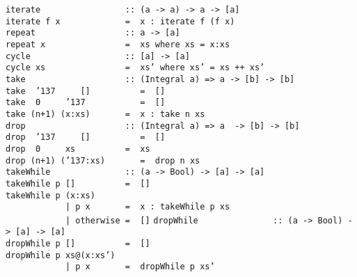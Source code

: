 %
\eprogB\noindent\bprogB
\mbox{\tt iterate\ \ \ \ \ \ \ \ \ \ \ \ \ \ \ \ \ ::\ (a\ ->\ a)\ ->\ a\ ->\ [a]}\\
\mbox{\tt iterate\ f\ x\ \ \ \ \ \ \ \ \ \ \ \ \ =\ \ x\ :\ iterate\ f\ (f\ x)}
%
\eprogB\noindent\bprogB
\mbox{\tt repeat\ \ \ \ \ \ \ \ \ \ \ \ \ \ \ \ \ \ ::\ a\ ->\ [a]}\\
\mbox{\tt repeat\ x\ \ \ \ \ \ \ \ \ \ \ \ \ \ \ \ =\ \ xs\ where\ xs\ =\ x:xs}
%
\eprogB\noindent\bprogB
\mbox{\tt cycle\ \ \ \ \ \ \ \ \ \ \ \ \ \ \ \ \ \ \ ::\ [a]\ ->\ [a]}\\
\mbox{\tt cycle\ xs\ \ \ \ \ \ \ \ \ \ \ \ \ \ \ \ =\ \ xs'\ where\ xs'\ =\ xs\ ++\ xs'}
%
\eprogB\noindent\bprogB
\mbox{\tt take\ \ \ \ \ \ \ \ \ \ \ \ \ \ \ \ \ \ \ \ ::\ (Integral\ a)\ =>\ a\ ->\ [b]\ ->\ [b]}\\
\mbox{\tt take\ \ {\char'137}\ \ \ \ \ []\ \ \ \ \ \ \ \ \ \ =\ \ []}\\
\mbox{\tt take\ \ 0\ \ \ \ \ {\char'137}\ \ \ \ \ \ \ \ \ \ \ =\ \ []}\\
\mbox{\tt take\ (n+1)\ (x:xs)\ \ \ \ \ \ \ =\ \ x\ :\ take\ n\ xs}
%
\eprogB\noindent\bprogB
\mbox{\tt drop\ \ \ \ \ \ \ \ \ \ \ \ \ \ \ \ \ \ \ \ ::\ (Integral\ a)\ =>\ a\ \ ->\ [b]\ ->\ [b]}\\
\mbox{\tt drop\ \ {\char'137}\ \ \ \ \ []\ \ \ \ \ \ \ \ \ \ =\ \ []}\\
\mbox{\tt drop\ \ 0\ \ \ \ \ xs\ \ \ \ \ \ \ \ \ \ =\ \ xs}\\
\mbox{\tt drop\ (n+1)\ ({\char'137}:xs)\ \ \ \ \ \ \ =\ \ drop\ n\ xs}
%
\eprogB\noindent\bprogB
\mbox{\tt takeWhile\ \ \ \ \ \ \ \ \ \ \ \ \ \ \ ::\ (a\ ->\ Bool)\ ->\ [a]\ ->\ [a]}\\
\mbox{\tt takeWhile\ p\ []\ \ \ \ \ \ \ \ \ \ =\ \ []}\\
\mbox{\tt takeWhile\ p\ (x:xs)\ }\\
\mbox{\tt \ \ \ \ \ \ \ \ \ \ \ \ |\ p\ x\ \ \ \ \ \ \ =\ \ x\ :\ takeWhile\ p\ xs}\\
\mbox{\tt \ \ \ \ \ \ \ \ \ \ \ \ |\ otherwise\ =\ \ []}
%
\eprogB\noindent\bprogB
\mbox{\tt dropWhile\ \ \ \ \ \ \ \ \ \ \ \ \ \ \ ::\ (a\ ->\ Bool)\ ->\ [a]\ ->\ [a]}\\
\mbox{\tt dropWhile\ p\ []\ \ \ \ \ \ \ \ \ \ =\ \ []}\\
\mbox{\tt dropWhile\ p\ xs@(x:xs')}\\
\mbox{\tt \ \ \ \ \ \ \ \ \ \ \ \ |\ p\ x\ \ \ \ \ \ \ =\ \ dropWhile\ p\ xs'}\\
